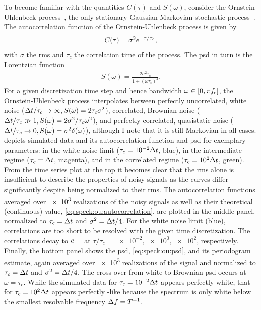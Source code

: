 To become familiar with the quantities $C(\tau)$ and $S(\omega)$, consider the Ornstein-Uhlenbeck process~\cite{Uhlenbeck1930}, the only stationary Gaussian Markovian stochastic process~\cite{VanKampen1976}.
The autocorrelation function of the Ornstein-Uhlenbeck process is given by
\begin{align}\label{eq:speck:ou:autocorrelation}
    C(\tau) = \sigma^2e^{-\tau/\tau_c},
\end{align}
with $\sigma$ the \gls{rms} and $\tau_c$ the correlation time of the process.
The \gls{psd} in turn is the Lorentzian function
\begin{align}\label{eq:speck:ou:psd}
    S(\omega) = \frac{2\sigma^2\tau_c}{1 + (\omega\tau_c)^2}.
\end{align}
For a given discretization time step \dt and hence bandwidth $\omega\in [0, \pi f_{\mathrm{s}}]$, the Ornstein-Uhlenbeck process interpolates between perfectly uncorrelated, white noise ($\Delta t/\tau_c\to\infty, S(\omega) = 2\tau_c\sigma^2$), correlated, Brownian noise ($\Delta t/\tau_c\gg 1, S(\omega) = 2\sigma^2/\tau_c\omega^2$), and perfectly correlated, quasistatic noise ($\Delta t/\tau_c\to 0, S(\omega) = \sigma^2\delta(\omega)$), although I note that it is still Markovian in all cases.
 depicts simulated data and its autocorrelation function and \gls{psd} for exemplary parameters: in the white noise limit ($\tau_c = \num{e-2}\Delta t$, blue), in the intermediate regime ($\tau_c = \Delta t$, magenta), and in the correlated regime ($\tau_c = \num{e+2}\Delta t$, green).
From the time series plot at the top it becomes clear that the \gls{rms} alone is insufficient to describe the properties of noisy signals as the curves differ significantly despite being normalized to their \gls{rms}.
The autocorrelation functions averaged over \num{e3} realizations of the noisy signals as well as their theoretical (continuous) value, \cref{eq:speck:ou:autocorrelation}, are plotted in the middle panel, normalized to $\tau_c=\Delta t$ and $\sigma^2=\Delta t/4$.
For the white noise limit (blue), correlations are too short to be resolved with the given time discretization.
The correlations decay to $e^{-1}$ at $\tau/\tau_c=\num{e-2},\num{e0},\num{e+2}$, respectively.
Finally, the bottom panel shows the \gls{psd}, \cref{eq:speck:ou:psd}, and its periodogram estimate, again averaged over \num{e3} realizations of the signal and normalized to $\tau_c=\Delta t$ and $\sigma^2=\Delta t/4$.
The cross-over from white to Brownian \gls{psd} occurs at $\omega = \tau_c$.
While the simulated data for $\tau_c = \num{e-2}\Delta t$ appears perfectly white, that for $\tau_c = \num{e2}\Delta t$ appears perfectly \oneoverf-like because the spectrum is only white below the smallest resolvable frequency $\Delta f = T^{-1}$.

